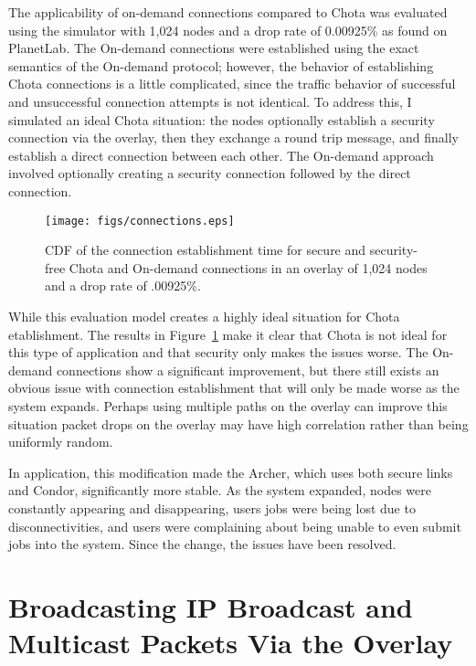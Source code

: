 The applicability of on-demand connections compared to Chota was evaluated
using the simulator with 1,024 nodes and a drop rate of 0.00925\% as found on
PlanetLab.  The On-demand connections were established using the exact semantics
of the On-demand protocol; however, the behavior of establishing Chota
connections is a little complicated, since the traffic behavior of successful
and unsuccessful connection attempts is not identical.  To address this, I
simulated an ideal Chota situation:  the nodes optionally establish a security
connection via the overlay, then they exchange a round trip message, and
finally establish a direct connection between each other.  The On-demand
approach involved optionally creating a security connection followed by the
direct connection.  

\begin{figure}
\centering
\texttt{[image: figs/connections.eps]}
\caption[Time to form a direct connection]{CDF of the connection establishment
time for secure and security-free Chota and On-demand connections in an overlay
of 1,024 nodes and a drop rate of .00925\%.}
\label{fig:connections}
\end{figure}

While this evaluation model creates a highly ideal situation for Chota
etablishment.  The results in Figure~\ref{fig:connections} make it clear that
Chota is not ideal for this type of application and that security only makes
the issues worse.  The On-demand connections show a significant improvement, but
there still exists an obvious issue with connection establishment that will
only be made worse as the system expands.  Perhaps using multiple paths on the
overlay can improve this situation packet drops on the overlay may have high
correlation rather than being uniformly random.

In application, this modification made the Archer, which uses both secure links
and Condor, significantly more stable.  As the system expanded, nodes were
constantly appearing and disappearing, users jobs were being lost due to
disconnectivities, and users were complaining about being unable to even submit
jobs into the system.  Since the change, the issues have been resolved.

\section{Broadcasting IP Broadcast and Multicast Packets Via the Overlay}


